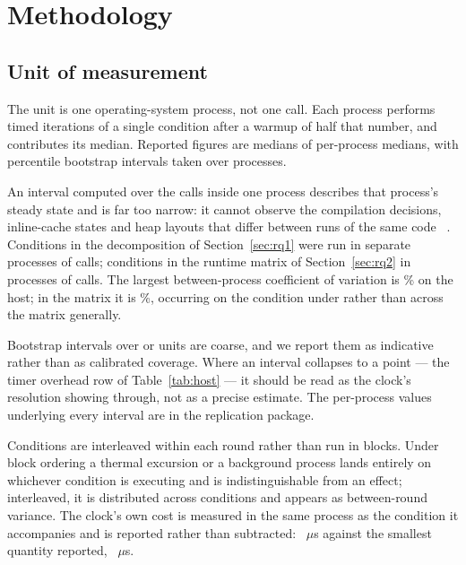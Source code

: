 \documentclass[pdflatex,sn-basic,twocolumn]{sn-jnl}%
\providecommand{\DIFaddbegin}{} %
\providecommand{\DIFaddend}{} %
\providecommand{\DIFdelbegin}{} %
\providecommand{\DIFdelend}{} %
\newcommand{\DIFscaledelfig}{0.5}
\newlength{\DIFdelgraphicswidth} %
\newlength{\DIFdelgraphicsheight} %
\newcommand{\DIFaddincludegraphics}[2][]{{\color{blue}\fbox{\DIFOincludegraphics[#1]{#2}}}} %
\newcommand{\DIFdelincludegraphics}[2][]{%
\sbox{\DIFdelgraphicsbox}{\DIFOincludegraphics[#1]{#2}}%
\settoboxwidth{\DIFdelgraphicswidth}{\DIFdelgraphicsbox} %
\settoboxtotalheight{\DIFdelgraphicsheight}{\DIFdelgraphicsbox} %
\scalebox{\DIFscaledelfig}{%
\parbox[b]{\DIFdelgraphicswidth}{\usebox{\DIFdelgraphicsbox}\\[-\baselineskip] \rule{\DIFdelgraphicswidth}{0em}}\llap{\resizebox{\DIFdelgraphicswidth}{\DIFdelgraphicsheight}{%
\setlength{\unitlength}{\DIFdelgraphicswidth}%
\begin{picture}(1,1)%
\thicklines\linethickness{2pt} %
{\color[rgb]{1,0,0}\put(0,0){\framebox(1,1){}}}%
{\color[rgb]{1,0,0}\put(0,0){\line( 1,1){1}}}%
{\color[rgb]{1,0,0}\put(0,1){\line(1,-1){1}}}%
\end{picture}%
}\hspace*{3pt}}} %
} %
\DeclareRobustCommand{\DIFaddbegin}{\DIFOaddbegin \let\includegraphics\DIFaddincludegraphics} %
\DeclareRobustCommand{\DIFaddend}{\DIFOaddend \let\includegraphics\DIFOincludegraphics} %
\DeclareRobustCommand{\DIFdelbegin}{\DIFOdelbegin \let\includegraphics\DIFdelincludegraphics} %
\DeclareRobustCommand{\DIFdelend}{\DIFOaddend \let\includegraphics\DIFOincludegraphics} %
\begin{document}
\section{Methodology}\label{sec:method}

\subsection{Unit of measurement}\label{sec:unit}

The unit is one operating-system process, not one call. Each process performs
\HostCallsPerInvocation{} timed iterations of a single condition after a warmup
of half that number, and contributes its median. Reported figures are medians of
per-process medians, with percentile bootstrap intervals taken over processes.

An interval computed over the calls inside one process describes that process's
steady state and is far too narrow: it cannot observe the compilation decisions,
inline-cache states and heap layouts that differ between runs of the same
code~\DIFdelbegin %
\DIFdelend \DIFaddbegin \citep{georges2007statistically}\DIFaddend . Conditions in the decomposition of
Section~\ref{sec:rq1} were run in \HostInvocations{} separate processes of
\HostCallsPerInvocation{} calls; conditions in the runtime matrix of
Section~\ref{sec:rq2} in \MatrixInvocations{} processes of
\MatrixCallsPerInvocation{} calls. The largest between-process coefficient of
variation is \HostCvMax\% on the host; in the matrix it is \MatrixCvMax\%,
occurring on the \MatrixCvMaxCondition{} condition under
\MatrixCvMaxEnvironment{} rather than across the matrix generally.

Bootstrap intervals over \HostInvocations{} or \MatrixInvocations{} units are
coarse, and we report them as indicative rather than as calibrated coverage.
Where an interval collapses to a point --- the timer overhead row of
Table~\ref{tab:host} --- it should be read as the clock's resolution showing
through, not as a precise estimate. The per-process values underlying every
interval are in the replication package.

Conditions are interleaved within each round rather than run in blocks. Under
block ordering a thermal excursion or a background process lands entirely on
whichever condition is executing and is indistinguishable from an effect;
interleaved, it is distributed across conditions and appears as between-round
variance. The clock's own cost is measured in the same process as the condition
it accompanies and is reported rather than subtracted: \HostTimerOverhead~$\mu$s
against the smallest quantity reported, \HostCreateSecretKey~$\mu$s.
\end{document}
